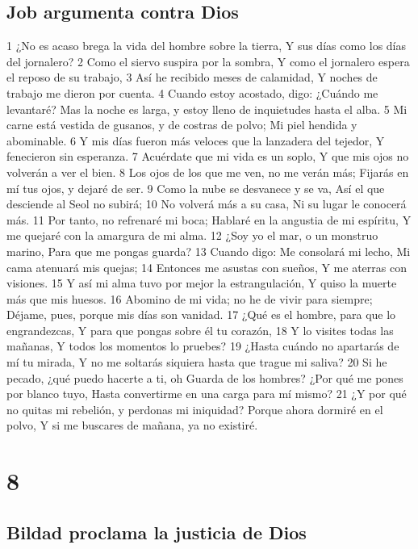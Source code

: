 \section*{Job argumenta contra Dios  }


1 ¿No es acaso brega la vida del hombre sobre la tierra,  
Y sus días como los días del jornalero?  
2 Como el siervo suspira por la sombra,  
Y como el jornalero espera el reposo de su trabajo, 
3 Así he recibido meses de calamidad,  
Y noches de trabajo me dieron por cuenta.  
4 Cuando estoy acostado, digo: ¿Cuándo me levantaré?  
Mas la noche es larga, y estoy lleno de inquietudes hasta el alba. 
5 Mi carne está vestida de gusanos, y de costras de polvo;  
Mi piel hendida y abominable.  
6 Y mis días fueron más veloces que la lanzadera del tejedor,  
Y fenecieron sin esperanza.  
7 Acuérdate que mi vida es un soplo,  
Y que mis ojos no volverán a ver el bien.  
8 Los ojos de los que me ven, no me verán más;  
Fijarás en mí tus ojos, y dejaré de ser.  
9 Como la nube se desvanece y se va,  
Así el que desciende al Seol no subirá;  
10 No volverá más a su casa,  
Ni su lugar le conocerá más.  
11 Por tanto, no refrenaré mi boca;  
Hablaré en la angustia de mi espíritu,  
Y me quejaré con la amargura de mi alma.  
12 ¿Soy yo el mar, o un monstruo marino,  
Para que me pongas guarda?  
13 Cuando digo: Me consolará mi lecho,  
Mi cama atenuará mis quejas; 
14 Entonces me asustas con sueños,  
Y me aterras con visiones.  
15 Y así mi alma tuvo por mejor la estrangulación,  
Y quiso la muerte más que mis huesos.  
16 Abomino de mi vida; no he de vivir para siempre;  
Déjame, pues, porque mis días son vanidad.  
17 ¿Qué es el hombre, para que lo engrandezcas,  
Y para que pongas sobre él tu corazón, 
18 Y lo visites todas las mañanas,  
Y todos los momentos lo pruebes?  
19 ¿Hasta cuándo no apartarás de mí tu mirada,  
Y no me soltarás siquiera hasta que trague mi saliva?  
20 Si he pecado, ¿qué puedo hacerte a ti, oh Guarda de los hombres?  
¿Por qué me pones por blanco tuyo,  
Hasta convertirme en una carga para mí mismo?  
21 ¿Y por qué no quitas mi rebelión, y perdonas mi iniquidad?  
Porque ahora dormiré en el polvo,  
Y si me buscares de mañana, ya no existiré.  

\chapter{8}

\section*{Bildad proclama la justicia de Dios  }


